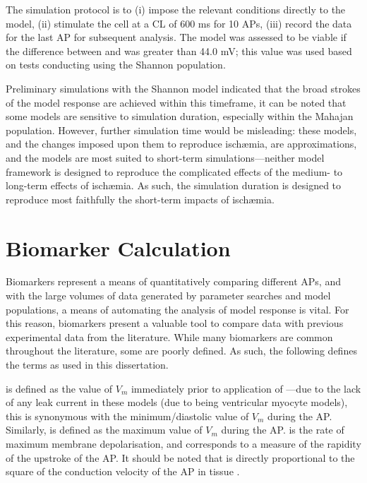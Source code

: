 \documentclass[../thesis-main.tex]{subfiles}
\begin{document}
The simulation protocol is to (i) impose the relevant conditions directly to the model, (ii) stimulate the cell at a CL of 600 ms for 10 APs, (iii) record the data for the last AP for subsequent analysis. The model was assessed to be viable if the difference between \vmax{} and \vest{} was greater than 44.0 mV; this value was used based on tests conducting using the Shannon population.

Preliminary simulations with the Shannon model indicated that the broad strokes of the model response are achieved within this timeframe, it can be noted that some models are sensitive to simulation duration, especially within the Mahajan population. However, further simulation time would be misleading: these models, and the changes imposed upon them to reproduce isch\ae{}mia, are approximations, and the models are most suited to short-term simulations---neither model framework is designed to reproduce the complicated effects of the medium- to long-term effects of isch\ae{}mia. As such, the simulation duration is designed to reproduce most faithfully the short-term impacts of isch\ae{}mia.


\section{Biomarker Calculation}
\label{sec:biomarkers}

Biomarkers represent a means of quantitatively comparing different APs, and with the large volumes of data generated by parameter searches and model populations, a means of automating the analysis of model response is vital. For this reason, biomarkers present a valuable tool to compare data with previous experimental data from the literature. While many biomarkers are common throughout the literature, some are poorly defined. As such, the following defines the terms as used in this dissertation.

\vrest{} is defined as the value of $V_m$ immediately prior to application of \istim{}---due to the lack of any leak current in these models (due to being ventricular myocyte models), this is synonymous with the minimum/diastolic value of $V_m$ during the AP. Similarly, \vmax{} is defined as the maximum value of $V_m$ during the AP. \dvdt{} is the rate of maximum membrane depolarisation, and corresponds to a measure of the rapidity of the upstroke of the AP. It should be noted that \dvdt{} is directly proportional to the square of the conduction velocity of the AP in tissue \citep{Hodgkin1954, Kleber2004, Walton1983, Tasaki1957}.
\end{document}
